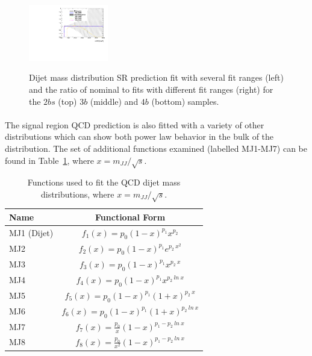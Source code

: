 \begin{figure}[htbp!]
\begin{center}
\includegraphics[width=0.31\textwidth,angle=-90]{figures/boosted/Syst_Smooth/smoothFuncRangeCompare_44_comp_ratio.pdf} \\
\caption{Dijet mass distribution SR prediction fit with several fit ranges (left) and the ratio of nominal to fits with different fit ranges (right)  for the $2bs$ (top) $3b$ (middle) and $4b$ (bottom) samples. }
\label{fig:qcd_fit_range_sys_ratio-scaled}
\end{center}
\end{figure}

\paragraph{}
The signal region QCD prediction is also fitted with a variety of other distributions which can show both power law behavior in the bulk of the distribution. 
The set of additional functions examined (labelled MJ1-MJ7) can be found in Table~\ref{tab:fit_funcs}, where $x = m_{JJ} / \sqrt{s}$.

\begin{table}[htbp!]
\begin{center} 
\begin{tabular}{  l | c}
Name & Functional Form \\
\hline
MJ1 (Dijet) & $f_{1}(x) = p_0 (1-x)^{p_1} x^{p_2}$ \\
MJ2 & $f_{2}(x) = p_0 (1-x)^{p_1} e^{p_2\ x^2}$ \\
MJ3 & $f_{3}(x) = p_0 (1-x)^{p_1} x^{p_2\ x}$ \\
MJ4 & $f_{4}(x) = p_0 (1-x)^{p_1} x^{p_2\ ln\ x}$ \\
MJ5 & $f_{5}(x) = p_0 (1-x)^{p_1} (1+x)^{p_2\ x}$ \\
MJ6 & $f_{6}(x) = p_0 (1-x)^{p_1} (1+x)^{p_2\ ln\ x}$ \\
MJ7 & $f_{7}(x) = \frac{p_0}{x} (1-x)^{p_1 - p_2\ ln\ x}$ \\
MJ8 & $f_{8}(x) = \frac{p_0}{x^2} (1-x)^{p_1 - p_2\ ln\ x}$ \\
\hline
\end{tabular}
\caption{Functions used to fit the QCD dijet mass distributions, where $x = m_{JJ} / \sqrt{s}$.}
\label{tab:fit_funcs}
\end{center}
\end{table}

